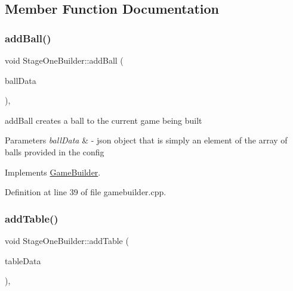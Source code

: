 \subsection{Member Function Documentation}
\mbox{\label{class_stage_one_builder_a9d7931aab89afcfa0b2c23da6fb10bfb}} 
\subsubsection{\texorpdfstring{add\+Ball()}{addBall()}}
{\footnotesize\ttfamily void Stage\+One\+Builder\+::add\+Ball (\begin{DoxyParamCaption}\item[{Q\+Json\+Object \&}]{ball\+Data }\end{DoxyParamCaption})\hspace{0.3cm}{\ttfamily [override]}, {\ttfamily [virtual]}}



add\+Ball creates a ball to the current game being built 


\begin{DoxyParams}{Parameters}
{\em ball\+Data} & -\/ json object that is simply an element of the array of balls provided in the config \\
\hline
\end{DoxyParams}


Implements \mbox{\hyperlink{class_game_builder_a836186637bd2f7844f7dfac0135d833b}{Game\+Builder}}.



Definition at line 39 of file gamebuilder.\+cpp.

\mbox{\label{class_stage_one_builder_ac8f35ec11ebe31010410bc50b0149ce9}} 
\subsubsection{\texorpdfstring{add\+Table()}{addTable()}}
{\footnotesize\ttfamily void Stage\+One\+Builder\+::add\+Table (\begin{DoxyParamCaption}\item[{Q\+Json\+Object \&}]{table\+Data }\end{DoxyParamCaption})\hspace{0.3cm}{\ttfamily [override]}, {\ttfamily [virtual]}}



